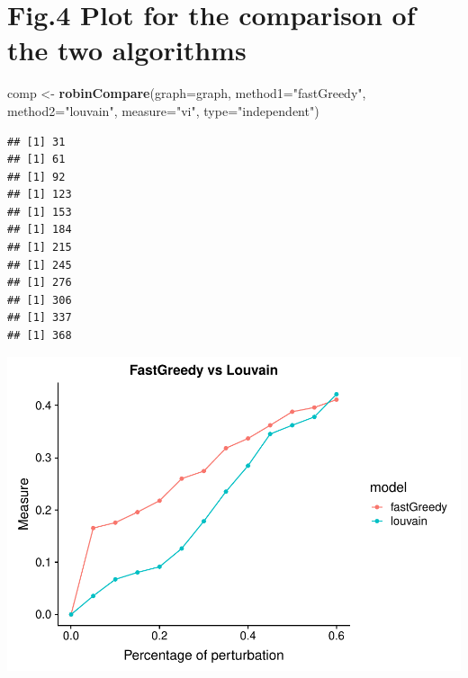 \documentclass[]{article}
\newenvironment{Shaded}{\begin{snugshade}}{\end{snugshade}}
\newcommand{\KeywordTok}[1]{\textcolor[rgb]{0.13,0.29,0.53}{\textbf{#1}}}
\newcommand{\DataTypeTok}[1]{\textcolor[rgb]{0.13,0.29,0.53}{#1}}
\newcommand{\StringTok}[1]{\textcolor[rgb]{0.31,0.60,0.02}{#1}}
\newcommand{\OperatorTok}[1]{\textcolor[rgb]{0.81,0.36,0.00}{\textbf{#1}}}
\newcommand{\NormalTok}[1]{#1}
\begin{document}
\section{Fig.4 Plot for the comparison of the two
algorithms}\label{fig.4-plot-for-the-comparison-of-the-two-algorithms}

\begin{Shaded}
\begin{Highlighting}[]
\NormalTok{comp <-}\StringTok{ }\KeywordTok{robinCompare}\NormalTok{(}\DataTypeTok{graph=}\NormalTok{graph, }\DataTypeTok{method1=}\StringTok{"fastGreedy"}\NormalTok{,}
                \DataTypeTok{method2=}\StringTok{"louvain"}\NormalTok{, }\DataTypeTok{measure=}\StringTok{"vi"}\NormalTok{, }\DataTypeTok{type=}\StringTok{"independent"}\NormalTok{)}
\end{Highlighting}
\end{Shaded}

\begin{verbatim}
## [1] 31
## [1] 61
## [1] 92
## [1] 123
## [1] 153
## [1] 184
## [1] 215
## [1] 245
## [1] 276
## [1] 306
## [1] 337
## [1] 368
\end{verbatim}

\begin{Shaded}
\end{Shaded}

\includegraphics{Figure_Paper_files/figure-latex/unnamed-chunk-2-1.pdf}
\end{document}
